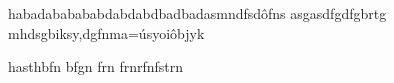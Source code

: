 habadababababdabdabdbadbadasmndfsdôfns
asgasdfgdfgbrtg mhdsgbiksy,dgfnma=úsyoiôbjyk

hasthbfn bfgn
 frn
 frnrfnfstrn